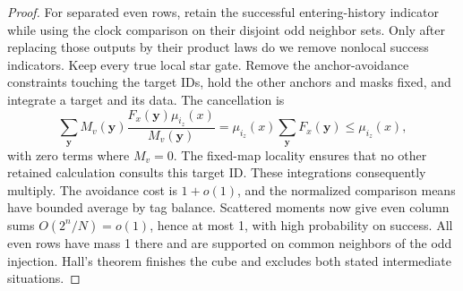 \begin{proof}
For separated even rows, retain the successful entering-history indicator while using the clock comparison on their disjoint odd neighbor sets. Only after replacing those outputs by their product laws do we remove nonlocal success indicators. Keep every true local star gate. Remove the anchor-avoidance constraints touching the target IDs, hold the other anchors and masks fixed, and integrate a target and its data. The cancellation is
\[
 \sum_{\mathbf y}M_v(\mathbf y)
       \frac{F_x(\mathbf y)\mu_{i_z}(x)}{M_v(\mathbf y)}
   =\mu_{i_z}(x)\sum_{\mathbf y}F_x(\mathbf y)
   \le\mu_{i_z}(x),
\]
with zero terms where \(M_v=0\). The fixed-map locality ensures that no other retained calculation consults this target ID. These integrations consequently multiply. The avoidance cost is \(1+o(1)\), and the normalized comparison means have bounded average by tag balance. Scattered moments now give even column sums \(O(2^n/N)=o(1)\), hence at most 1, with high probability on success. All even rows have mass 1 there and are supported on common neighbors of the odd injection. Hall's theorem finishes the cube and excludes both stated intermediate situations.

\end{proof}
